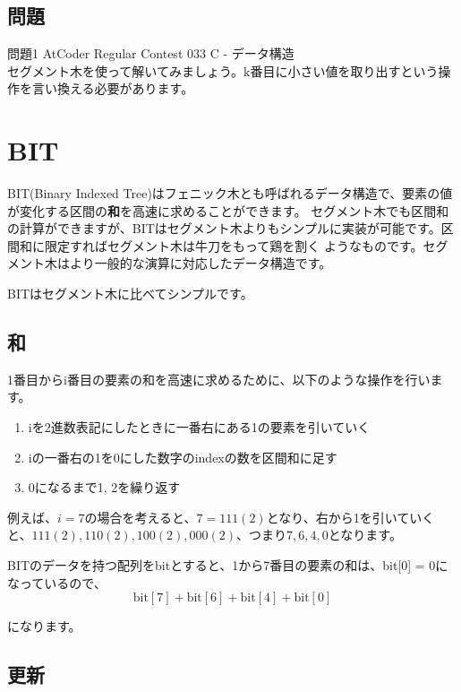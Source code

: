 \documentclass{jlreq}
\begin{document}
\subsection{問題}
\noindent 問題1 AtCoder Regular Contest 033 C - データ構造 \\
セグメント木を使って解いてみましょう。k番目に小さい値を取り出すという操作を言い換える必要があります。

\newpage

\section{BIT}
BIT(Binary Indexed Tree)はフェニック木とも呼ばれるデータ構造で、要素の値が変化する区間の\textbf{和}を高速に求めることができます。
セグメント木でも区間和の計算ができますが、BITはセグメント木よりもシンプルに実装が可能です。区間和に限定すればセグメント木は牛刀をもって鶏を割く
ようなものです。セグメント木はより一般的な演算に対応したデータ構造です。

BITはセグメント木に比べてシンプルです。

\subsection{和}

1番目からi番目の要素の和を高速に求めるために、以下のような操作を行います。

\begin{enumerate}
	\item iを2進数表記にしたときに一番右にある1の要素を引いていく
	\item iの一番右の1を0にした数字のindexの数を区間和に足す
	\item 0になるまで1, 2を繰り返す
\end{enumerate}

例えば、$i = 7$の場合を考えると、$7 = 111(2)$となり、右から1を引いていくと、$111(2), 110(2), 100(2), 000(2)$、つまり$7, 6, 4, 0$となります。

BITのデータを持つ配列をbitとすると、1から7番目の要素の和は、bit[0] = 0になっているので、
\begin{equation*}
	\text{bit}[7] + \text{bit}[6] + \text{bit}[4] + \text{bit}[0]
\end{equation*}

になります。

\subsection{更新}
\end{document}
